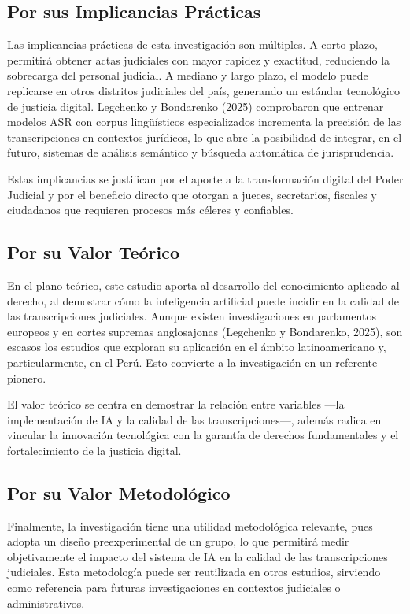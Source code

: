 \documentclass[12pt,a4paper,oneside]{report}
\begin{document}
\subsection{Por sus Implicancias Prácticas}

Las implicancias prácticas de esta investigación son múltiples. A corto plazo, permitirá obtener actas judiciales con mayor rapidez y exactitud, reduciendo la sobrecarga del personal judicial. A mediano y largo plazo, el modelo puede replicarse en otros distritos judiciales del país, generando un estándar tecnológico de justicia digital. Legchenko y Bondarenko (2025) comprobaron que entrenar modelos ASR con corpus lingüísticos especializados incrementa la precisión de las transcripciones en contextos jurídicos, lo que abre la posibilidad de integrar, en el futuro, sistemas de análisis semántico y búsqueda automática de jurisprudencia.

Estas implicancias se justifican por el aporte a la transformación digital del Poder Judicial y por el beneficio directo que otorgan a jueces, secretarios, fiscales y ciudadanos que requieren procesos más céleres y confiables.

\subsection{Por su Valor Teórico}

En el plano teórico, este estudio aporta al desarrollo del conocimiento aplicado al derecho, al demostrar cómo la inteligencia artificial puede incidir en la calidad de las transcripciones judiciales. Aunque existen investigaciones en parlamentos europeos y en cortes supremas anglosajonas (Legchenko y Bondarenko, 2025), son escasos los estudios que exploran su aplicación en el ámbito latinoamericano y, particularmente, en el Perú. Esto convierte a la investigación en un referente pionero.

El valor teórico se centra en demostrar la relación entre variables —la implementación de IA y la calidad de las transcripciones—, además radica en vincular la innovación tecnológica con la garantía de derechos fundamentales y el fortalecimiento de la justicia digital.

\subsection{Por su Valor Metodológico}

Finalmente, la investigación tiene una utilidad metodológica relevante, pues adopta un diseño preexperimental de un grupo, lo que permitirá medir objetivamente el impacto del sistema de IA en la calidad de las transcripciones judiciales. Esta metodología puede ser reutilizada en otros estudios, sirviendo como referencia para futuras investigaciones en contextos judiciales o administrativos.
\end{document}
